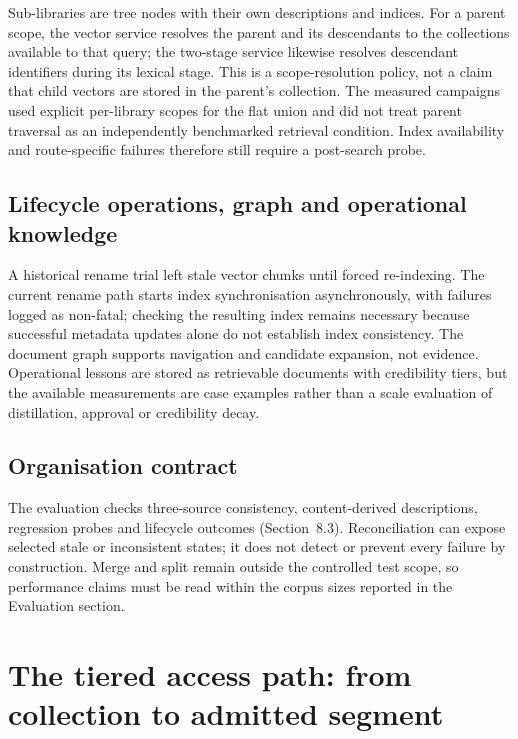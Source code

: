 \documentclass[11pt]{article}
\begin{document}
Sub-libraries are tree nodes with their own descriptions and indices. For a
parent scope, the vector service resolves the parent and its descendants to the
collections available to that query; the two-stage service likewise resolves
descendant identifiers during its lexical stage. This is a scope-resolution
policy, not a claim that child vectors are stored in the parent's collection.
The measured campaigns used explicit per-library scopes for the flat union and
did not treat parent traversal as an independently benchmarked retrieval
condition. Index availability and route-specific failures therefore still
require a post-search probe.

\subsection{Lifecycle operations, graph and operational knowledge}




A historical rename trial left stale vector chunks until forced re-indexing.
The current rename path starts index synchronisation asynchronously, with
failures logged as non-fatal; checking the resulting index remains necessary
because successful metadata updates alone do not establish index consistency. The document graph supports navigation and candidate
expansion, not evidence. Operational lessons are stored as retrievable
documents with credibility tiers, but the available measurements are case
examples rather than a scale evaluation of distillation, approval or
credibility decay.

\subsection{Organisation contract}



The evaluation checks three-source consistency, content-derived descriptions,
regression probes and lifecycle outcomes (Section~8.3). Reconciliation
can expose selected stale or inconsistent states; it does not detect or prevent
every failure by construction. Merge and split remain outside the controlled test
scope, so performance claims must be read within the corpus sizes reported in
the Evaluation section.


\section{The tiered access path: from collection to admitted segment}
\end{document}
